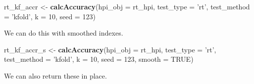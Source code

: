 \documentclass[]{article}
\newenvironment{Shaded}{\begin{snugshade}}{\end{snugshade}}
\newcommand{\DataTypeTok}[1]{\textcolor[rgb]{0.13,0.29,0.53}{#1}}
\newcommand{\DecValTok}[1]{\textcolor[rgb]{0.00,0.00,0.81}{#1}}
\newcommand{\KeywordTok}[1]{\textcolor[rgb]{0.13,0.29,0.53}{\textbf{#1}}}
\newcommand{\NormalTok}[1]{#1}
\newcommand{\OperatorTok}[1]{\textcolor[rgb]{0.81,0.36,0.00}{\textbf{#1}}}
\newcommand{\OtherTok}[1]{\textcolor[rgb]{0.56,0.35,0.01}{#1}}
\newcommand{\StringTok}[1]{\textcolor[rgb]{0.31,0.60,0.02}{#1}}
\begin{document}
\begin{Shaded}
\begin{Highlighting}[]
\NormalTok{  rt_kf_accr <-}\StringTok{ }\KeywordTok{calcAccuracy}\NormalTok{(}\DataTypeTok{hpi_obj =}\NormalTok{ rt_hpi,}
                             \DataTypeTok{test_type =} \StringTok{'rt'}\NormalTok{,}
                             \DataTypeTok{test_method =} \StringTok{'kfold'}\NormalTok{,}
                             \DataTypeTok{k =} \DecValTok{10}\NormalTok{,}
                             \DataTypeTok{seed =} \DecValTok{123}\NormalTok{)}
\end{Highlighting}
\end{Shaded}

We can do this with smoothed indexes.

\begin{Shaded}
\begin{Highlighting}[]
\NormalTok{  rt_kf_accr_s <-}\StringTok{ }\KeywordTok{calcAccuracy}\NormalTok{(}\DataTypeTok{hpi_obj =}\NormalTok{ rt_hpi,}
                               \DataTypeTok{test_type =} \StringTok{'rt'}\NormalTok{,}
                               \DataTypeTok{test_method =} \StringTok{'kfold'}\NormalTok{,}
                               \DataTypeTok{k =} \DecValTok{10}\NormalTok{,}
                               \DataTypeTok{seed =} \DecValTok{123}\NormalTok{,}
                               \DataTypeTok{smooth =} \OtherTok{TRUE}\NormalTok{)}
\end{Highlighting}
\end{Shaded}

We can also return these in place.

\begin{Shaded}
\end{Shaded}
\end{document}
